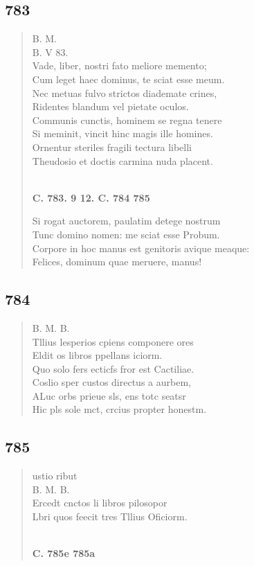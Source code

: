 \documentclass[11pt, a4paper]{report}
\begin{document}
            \subsection*{783}
      \begin{verse}
      B. M. \\ B. V 83. \\ Vade, liber, nostri fato meliore memento; \\ Cum leget haec dominus, te sciat esse meum. \\ Nec metuas fulvo strictos diademate crines, \\ Ridentes blandum vel pietate oculos. \\ Communis cunctis, hominem se regna tenere \\ Si meminit, vincit hinc magis ille homines. \\ Ornentur steriles fragili tectura libelli \\ Theudosio et doctis carmina nuda placent. \\ 
        ﻿\pagebreak 
    \begin{center} \textbf{C. 783. 9 12. C. 784 785} \end{center} \marginpar{[263]} Si rogat auctorem, paulatim detege nostrum \\ Tunc domino nomen: me sciat esse Probum. \\ Corpore in hoc manus est genitoris avique meaque: \\ Felices, dominum quae meruere, manus! \\ 
      \end{verse}
  
            \subsection*{784}
      \begin{verse}
      B. M. B. \\ Tllius lesperios cpiens componere ores \\ Eldit os libros ppellans iciorm. \\ Quo solo fers ecticfs fror est Cactiliae. \\ Coslio sper custos directus a aurbem, \\ ALuc orbs prieue sls, ens totc seatsr \\ Hic pls sole mct, crcius propter honestm. \\ 
      \end{verse}
  
            \subsection*{785}
      \begin{verse}
      ustio ribut \\ B. M. B. \\ Ercedt cnctos li libros pilosopor \\ Lbri quos feecit tres Tllius Oficiorm. \\ 
        ﻿\pagebreak 
     \marginpar{[264]} \begin{center} \textbf{C. 785e 785a} \end{center}
      \end{verse}
  
\end{document}
